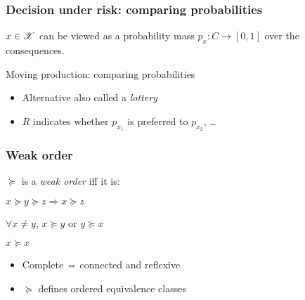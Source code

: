 \documentclass[french,english]{beamer}
\begin{document}
\begin{frame}
	\frametitle{Decision under risk: comparing probabilities}
	$x \in \mathscr{X}$ can be viewed as a probability mass $p_x: C → [0, 1]$ over the consequences.
	\begin{exampleblock}{Moving production: comparing probabilities}
		\centering
		\setlength{\DUNodeSep}{0mm}
		\setcounter{DBxc}{1}
		\setcounter{DBxc}{2}
	\end{exampleblock}
	\begin{itemize}
		\item Alternative also called a \emph{lottery}
		\item $R$ indicates whether $p_{x_1}$ is preferred to $p_{x_2}$, …
	\end{itemize}
\end{frame}

\begin{frame}
	\frametitle{Weak order}
	\begin{definition}
		$\succeq$ is a \emph{weak order} iff it is:
		\begin{description}[Connected]
			\item[Transitive] $x \succeq y \succeq z ⇒ x \succeq z$
			\item[Connected] $\forall x ≠ y$, $x \succeq y$ or $y \succeq x$
			\item[Reflexive] $x \succeq x$
		\end{description}
	\end{definition}
	\begin{itemize}
		\item Complete ⇔ connected and reflexive
		\item $\succeq$ defines ordered equivalence classes
	\end{itemize}
\end{frame}
\end{document}
